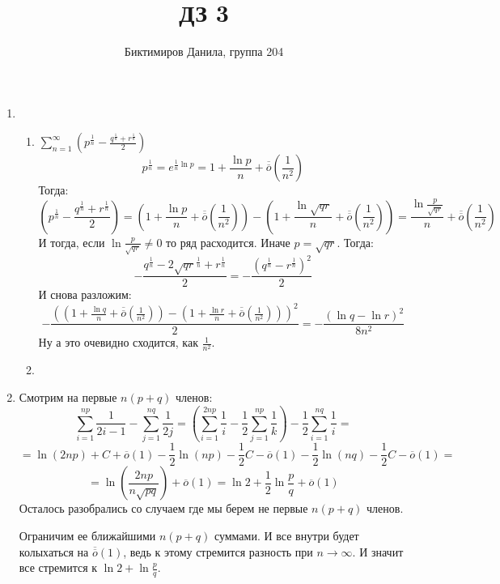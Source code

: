 \documentclass[11pt]{article}
\begin{document}
	
	\author{Биктимиров Данила, группа 204}
	\title{ДЗ 3}
	\date{}
	\maketitle
	
	\medskip
	
	\begin{enumerate}
		
		\item \begin{enumerate}
			\item $\sum_{n=1}^{\infty} \left(p^{\frac{1}{n}}-\frac{q^{\frac{1}{n}} + r^{\frac{1}{n}}}{2} \right)$
			$$p^{\frac{1}{n}} = e^{\frac{1}{n}\ln p}=1+\frac{\ln p}{n} + \overline{\overline{o}} \left(\frac{1}{n^2}\right)$$
			Тогда: $$ \left(p^{\frac{1}{n}} - \frac{q^{\frac{1}{n}} + r^{\frac{1}{n}}}{2} \right) = \left(1+\frac{\ln p}{n} + \overline{\overline{o}} \left(\frac{1}{n^2}\right)\right)-\left( 1+\frac{\ln \sqrt{qr}}{n} + \overline{\overline{o}} \left(\frac{1}{n^2}\right) \right)=\frac{\ln{\frac{p}{\sqrt{qr}}}}{n}+\overline{\overline{o}}\left(\frac{1}{n^2}\right)$$
			И тогда, если $\ln \frac{p}{\sqrt{qr}}\not=0$ то ряд расходится. Иначе $p=\sqrt{qr}$. Тогда: $$-\frac{q^\frac{1}{n}-2\sqrt{qr}^{\frac{1}{n}}+r^\frac{1}{n}}{2}=-\frac{\left(q^{\frac{1}{n}}-r^{\frac{1}{n}}\right)^2}{2}$$
			И снова разложим: $$-\frac{\left(\left(1+\frac{\ln q}{n} + \overline{\overline{o}} \left(\frac{1}{n^2}\right)\right)-\left(1+\frac{\ln r}{n} + \overline{\overline{o}} \left(\frac{1}{n^2}\right)\right)\right)^2}{2}=-\frac{\left(\ln q - \ln r\right)^2}{8n^2}$$
			Ну а это очевидно сходится, как $\frac{1}{n^2}$.
			
			\item
		\end{enumerate}
		\item Смотрим на первые $n(p+q)$ членов: $$ \sum_{i=1}^{np} \frac{1}{2i-1} - \sum_{j=1}^{nq} \frac{1}{2j} =\left(\sum_{i=1}^{2np} \frac{1}{i} - \frac{1}{2} \sum_{j=1}^{np} \frac{1}{k}\right) - \frac{1}{2} \sum_{i=1}^{nq} \frac{1}{i} =$$ $$ =\ln (2np) + C +\overline{o}(1) - \frac{1}{2} \ln (np) - \frac{1}{2}C-\overline{o}(1)-\frac{1}{2}\ln (nq) -  \frac{1}{2} C -\overline{o}(1) =$$ $$ = \ln \left(\frac{2np}{n\sqrt{pq}}\right) + \overline{o}(1) = \ln 2 + \frac{1}{2}\ln\frac{p}{q} + \overline{o}(1)$$
		Осталось разобрались со случаем где мы берем не первые $n(p+q)$ членов.
		
		Ограничим ее ближайшими $n(p+q)$ суммами. И все внутри будет колыхаться на $\overline{\overline{o}}(1)$, ведь к этому стремится разность при $n\to \infty$. И значит все стремится к $\ln 2 + \ln \frac{p}{q}$.
		

\end{enumerate}
\end{document}
